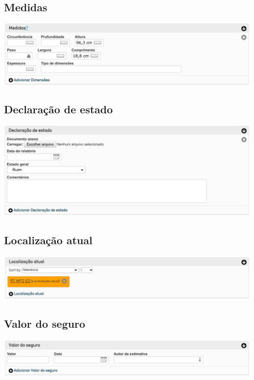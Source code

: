 \subsection{Medidas}
\begin{flushleft}
	\includegraphics[width=\linewidth]{elemento-12}
\end{flushleft}

\subsection{Declaração de estado}
\begin{flushleft}
	\includegraphics[width=\linewidth]{elemento-13}
\end{flushleft}

\subsection{Localização atual}
\begin{flushleft}
	\includegraphics[width=\linewidth]{elemento-14}
\end{flushleft}

\subsection{Valor do seguro}
\begin{flushleft}
	\includegraphics[width=\linewidth]{elemento-15}
\end{flushleft}


